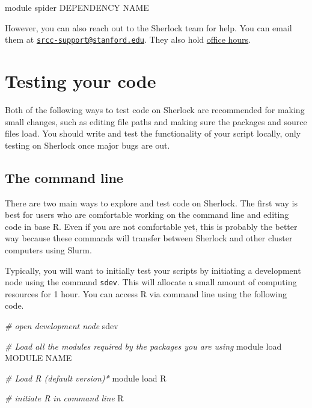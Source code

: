 \documentclass[
]{book}
\newenvironment{Shaded}{\begin{snugshade}}{\end{snugshade}}
\newcommand{\CommentTok}[1]{\textcolor[rgb]{0.56,0.35,0.01}{\textit{#1}}}
\newcommand{\ExtensionTok}[1]{#1}
\newcommand{\NormalTok}[1]{#1}
\begin{document}
\begin{Shaded}
\begin{Highlighting}[]
\ExtensionTok{module}\NormalTok{ spider DEPENDENCY NAME}
\end{Highlighting}
\end{Shaded}

However, you can also reach out to the Sherlock team for help. You can email them at \href{mailto:srcc-support@stanford.edu}{\nolinkurl{srcc-support@stanford.edu}}. They also hold \href{https://jumpstartsrcc.sites.stanford.edu/events/series/sherlock-office-hours}{office hours}.

\section{Testing your code}\label{testing-your-code}

Both of the following ways to test code on Sherlock are recommended for making small changes, such as editing file paths and making sure the packages and source files load. You should write and test the functionality of your script locally, only testing on Sherlock once major bugs are out.

\subsection{The command line}\label{the-command-line}

There are two main ways to explore and test code on Sherlock. The first way is best for users who are comfortable working on the command line and editing code in base R. Even if you are not comfortable yet, this is probably the better way because these commands will transfer between Sherlock and other cluster computers using Slurm.

Typically, you will want to initially test your scripts by initiating a development node using the command \texttt{sdev}. This will allocate a small amount of computing resources for 1 hour. You can access R via command line using the following code.

\begin{Shaded}
\begin{Highlighting}[]
\CommentTok{\# open development node}
\ExtensionTok{sdev}

\CommentTok{\# Load all the modules required by the packages you are using}
\ExtensionTok{module}\NormalTok{ load MODULE NAME  }

\CommentTok{\# Load R (default version)*}
\ExtensionTok{module}\NormalTok{ load R }

\CommentTok{\# initiate R in command line}
\ExtensionTok{R}
\end{Highlighting}
\end{Shaded}
\end{document}
